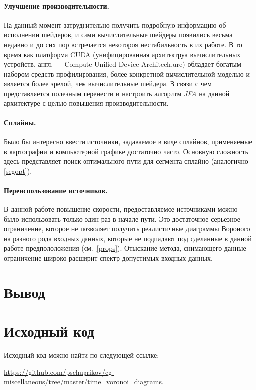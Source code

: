 \documentclass[12pt]{article}
\begin{document}
\paragraph{Улучшение производительности.} На данный момент затруднительно получить
подробную информацию об исполнении шейдеров, и сами вычислительные шейдеры появились
весьма недавно и до сих пор встречается некотороя нестабильность в их работе. В то 
время как платформа CUDA (унифицированная архитектруа вычислительных устройств, англ. 
--- Compute Unified Device Architechture) обладает богатым набором средств 
профилирования, более конкретной вычислительной моделью и является более зрелой, чем
вычислительные шейдера. В связи с чем представляется полезным перенести и настроить
алгоритм  \emph{JFA} на данной архитектуре с целью повышения производительности.

\paragraph{Сплайны.} Было бы интересно ввести источники, задаваемое в виде сплайнов,
применяемые в картографии и компьютерной графике достаточно часто. Основную сложность
здесь представляет поиск оптимального пути для сегмента сплайно (аналогично \ref{segopt}).

\paragraph{Переиспользование источников.} В данной работе повышение скорости, 
предоставляемое источниками можно было использовать только один раз в начале пути.
Это достаточное серьезное ограничение, которое не позволяет получить реалистичные
диаграммы Вороного на разного рода входных данных, которые не подпадают под 
сделанные в данной работе предпололожения (см.~\ref{props}). Отыскание метода,
снимающего данные ограничение широко расширит спектр допустимых входных данных.

\section{Вывод}

\pagebreak

\section{Исходный код}
\label{source}
Исходный код можно найти по следующей ссылке: 

\url{https://github.com/pschuprikov/cg-miscellaneous/tree/master/time_voronoi_diagrams}.
\end{document}
